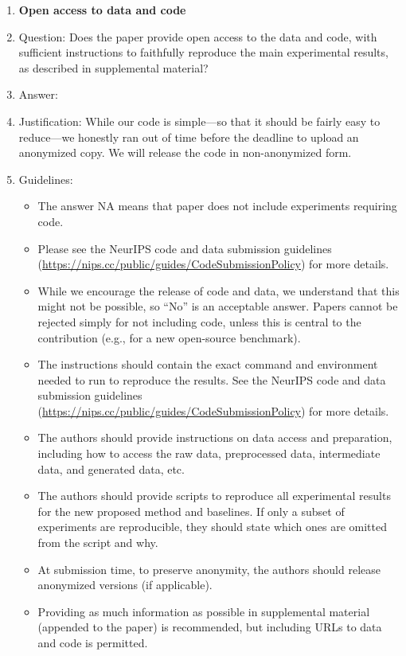 \documentclass{article}
\begin{document}
\begin{enumerate}
\item {\bf Open access to data and code}
    \item[] Question: Does the paper provide open access to the data and code, with sufficient instructions to faithfully reproduce the main experimental results, as described in supplemental material?
    \item[] Answer: \answerNo{} %
    \item[] Justification: While our code is simple---so that
      it should be fairly easy to reduce---we honestly ran out of time
      before the deadline to upload an anonymized copy. We will
      release the code in non-anonymized form.
    \item[] Guidelines:
    \begin{itemize}
        \item The answer NA means that paper does not include experiments requiring code.
        \item Please see the NeurIPS code and data submission guidelines (\url{https://nips.cc/public/guides/CodeSubmissionPolicy}) for more details.
        \item While we encourage the release of code and data, we understand that this might not be possible, so “No” is an acceptable answer. Papers cannot be rejected simply for not including code, unless this is central to the contribution (e.g., for a new open-source benchmark).
        \item The instructions should contain the exact command and environment needed to run to reproduce the results. See the NeurIPS code and data submission guidelines (\url{https://nips.cc/public/guides/CodeSubmissionPolicy}) for more details.
        \item The authors should provide instructions on data access and preparation, including how to access the raw data, preprocessed data, intermediate data, and generated data, etc.
        \item The authors should provide scripts to reproduce all experimental results for the new proposed method and baselines. If only a subset of experiments are reproducible, they should state which ones are omitted from the script and why.
        \item At submission time, to preserve anonymity, the authors should release anonymized versions (if applicable).
        \item Providing as much information as possible in supplemental material (appended to the paper) is recommended, but including URLs to data and code is permitted.
    \end{itemize}



\end{enumerate}
\end{document}
